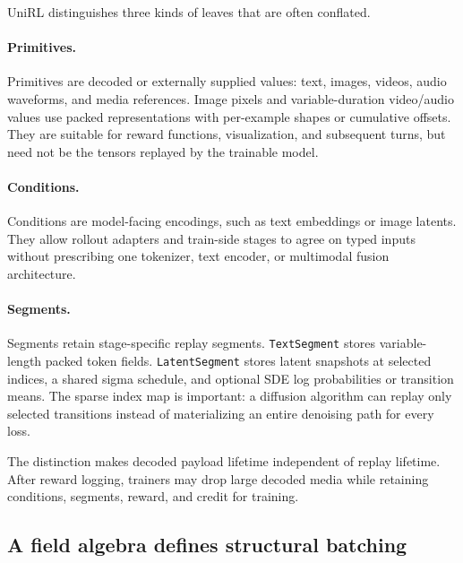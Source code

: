 \documentclass[10pt]{article}
\begin{document}
UniRL distinguishes three kinds of leaves that are often conflated.

\paragraph{Primitives.}
Primitives are decoded or externally supplied values: text, images, videos, audio waveforms, and media references.
Image pixels and variable-duration video/audio values use packed representations with per-example shapes or cumulative offsets.
They are suitable for reward functions, visualization, and subsequent turns, but need not be the tensors replayed by the trainable model.

\paragraph{Conditions.}
Conditions are model-facing encodings, such as text embeddings or image latents.
They allow rollout adapters and train-side stages to agree on typed inputs without prescribing one tokenizer, text encoder, or multimodal fusion architecture.

\paragraph{Segments.}
Segments retain stage-specific replay segments.
\texttt{TextSegment} stores variable-length packed token fields.
\texttt{LatentSegment} stores latent snapshots at selected indices, a shared sigma schedule, and optional SDE log probabilities or transition means.
The sparse index map is important: a diffusion algorithm can replay only selected transitions instead of materializing an entire denoising path for every loss.

The distinction makes decoded payload lifetime independent of replay lifetime.
After reward logging, trainers may drop large decoded media while retaining conditions, segments, reward, and credit for training.

\subsection{A field algebra defines structural batching}
\end{document}

